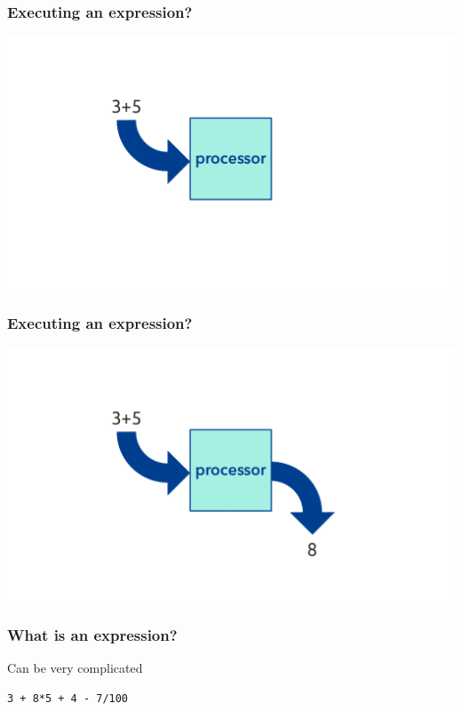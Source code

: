\documentclass[11pt]{beamer}
\begin{document}
\begin{frame}
  \frametitle{Executing an expression?}
  \includegraphics[width=\textwidth]{./img/computer-expression-0.png}
\end{frame}

\begin{frame}
  \frametitle{Executing an expression?}
  \includegraphics[width=\textwidth]{./img/computer-expression-1.png}
\end{frame}

\begin{frame}
  \frametitle{What is an \textbf{expression}?}
  \Enlarge

  \begin{itemize}
  \myitem  Can be very complicated
    \begin{itemize}
    \mysubitem  \texttt{3 + 8*5 + 4 - 7/100}
    \end{itemize}
  \end{itemize}
\end{frame}
\end{document}
